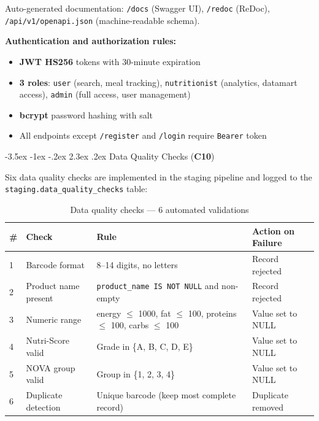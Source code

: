 \documentclass[a4paper,11pt,oneside,openany]{report}
\makeatletter
\renewcommand\section{\@startsection{section}{1}{\z@}%
  {-3.5ex \@plus -1ex \@minus -.2ex}%
  {2.3ex \@plus.2ex}%
  {\normalfont\Large\bfseries\color{ntgreen}}}
\newcommand{\competence}[1]{\textbf{\textcolor{ntgreen}{#1}}}
\makeatother
\begin{document}
Auto-generated documentation: \texttt{/docs} (Swagger UI), \texttt{/redoc}
(ReDoc), \texttt{/api/v1/openapi.json} (machine-readable schema).

\textbf{Authentication and authorization rules:}
\begin{itemize}[nosep]
  \item \textbf{JWT HS256} tokens with 30-minute expiration
  \item \textbf{3 roles}: \texttt{user} (search, meal tracking),
        \texttt{nutritionist} (analytics, datamart access),
        \texttt{admin} (full access, user management)
  \item \textbf{bcrypt} password hashing with salt
  \item All endpoints except \texttt{/register} and \texttt{/login} require
        \texttt{Bearer} token
\end{itemize}


\section{Data Quality Checks (\competence{C10})}
\label{sec:dq}

Six data quality checks are implemented in the staging pipeline and logged
to the \texttt{staging.data\_quality\_checks} table:

\begin{table}[H]
\centering
\caption{Data quality checks --- 6 automated validations}
\label{tab:dq-checks}
\begin{tabularx}{\textwidth}{C{0.5cm} L{3cm} L{4cm} L{5cm}}
\toprule
\textbf{\#} & \textbf{Check} & \textbf{Rule} & \textbf{Action on Failure} \\
 & Barcode format & 8--14 digits, no letters & Record rejected \\
2 & Product name present & \texttt{product\_name IS NOT NULL} and non-empty & Record rejected \\
3 & Numeric range & energy $\leq$ 1000, fat $\leq$ 100, proteins $\leq$ 100, carbs $\leq$ 100 & Value set to NULL \\
4 & Nutri-Score valid & Grade in \{A, B, C, D, E\} & Value set to NULL \\
5 & NOVA group valid & Group in \{1, 2, 3, 4\} & Value set to NULL \\
6 & Duplicate detection & Unique barcode (keep most complete record) & Duplicate removed \\
\bottomrule
\end{tabularx}
\end{table}
\end{document}
